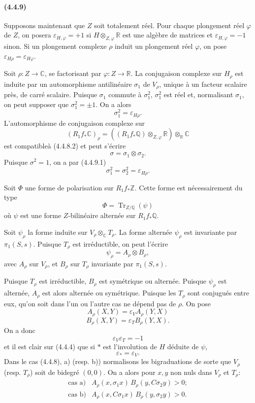 \documentclass[10pt]{article}
\newcommand{\C}{\mathbb C}
\newcommand{\Q}{\mathbb Q}
\newcommand{\Z}{\mathbb Z}
\newcommand{\fg}{\guillemotright}
\newcommand{\og}{\guillemotleft}
\newcommand{\R}{\mathbb R}
\newcommand{\Tr}{\operatorname{Tr}}
\begin{document}

\paragraph{(4.4.9)} Supposons maintenant que $Z$ soit totalement réel. Pour chaque plongement réel $\varphi$ de $Z$, on posera $\varepsilon_{H,\varphi}=+1$ si $H\otimes_{Z,\varphi}\R$ est une algèbre de matrices et $\varepsilon_{H,\varphi}=-1$ sinon. Si un plongement complexe $\rho$ induit un plongement réel $\varphi$, on pose $\varepsilon_{H\rho}=\varepsilon_{H\varphi}$.

Soit $\rho:Z\to\C$, se factorisant par $\varphi:Z\to\R$. La conjugaison complexe sur $H_\rho$ est induite par un automorphisme antilinéaire $\sigma_1$ de $V_\rho$, unique à un facteur scalaire près, de carré scalaire. Puisque $\sigma_1$ commute à $\sigma_1^2$, $\sigma_1^2$ est réel et, normalisant $\sigma_1$, on peut supposer que $\sigma_1^2=\pm1$. On a alors
\[
\tag{4.4.9.1}
\sigma_1^2=\varepsilon_{H\rho}.
\]
L'automorphisme de conjugaison complexe sur
\[
(R_1f_*\C)_\rho=((R_1f_*\Q)\otimes_{Z,\varphi}\R)\otimes_\R\C
\]
est \og compatible\fg à (4.4.8.2) et peut s'écrire
\[
\sigma=\sigma_1\otimes\sigma_2.
\]
Puisque $\sigma^2=1$, on a par (4.4.9.1)
\[
\tag{4.4.9.2}
\sigma_1^2=\sigma_2^2=\varepsilon_{H\rho}.
\]

Soit $\Phi$ une forme de polarisation sur $R_1f_*\Z$. Cette forme est nécessairement du type
\[
\Phi=\Tr_{Z/\Q}(\psi)
\]
où $\psi$ est une forme $Z$-bilinéaire alternée sur $R_1f_*\Q$.

Soit $\psi_\rho$ la forme induite sur $V_\rho\otimes_\C T_\rho$. La forme alternée $\psi_\rho$ est invariante par $\pi_1(S,s)$. Puisque $T_\rho$ est irréductible, on peut l'écrire
\[
\tag{4.4.9.3}
\psi_\rho=A_\rho\otimes B_\rho,
\]
avec $A_\rho$ sur $V_\rho$, et $B_\rho$ sur $T_\rho$ invariante par $\pi_1(S,s)$.

Puisque $T_\rho$ est irréductible, $B_\rho$ est symétrique ou alternée. Puisque $\psi_\rho$ est alternée, $A_\rho$ est alors alternée ou symétrique. Puisque les $T_\rho$ sont conjugués entre eux, qu'on soit dans l'un ou l'autre cas ne dépend pas de $\rho$. On pose
\[
\tag{4.4.9.4}
A_\rho(X,Y)=\varepsilon_V A_\rho(Y,X)
\]
\[
\tag{4.4.9.5}
B_\rho(X,Y)=\varepsilon_T B_\rho(Y,X).
\]
On a donc
\[
\tag{4.4.9.6}
\varepsilon_V\varepsilon_T=-1
\]
et il est clair sur (4.4.4) que si $*$ est l'involution de $H$ déduite de $\psi$,
\[
\tag{4.4.9.7}
\varepsilon_*=\varepsilon_V.
\]
Dans le cas (4.4.8), a) (resp. b)) normalisons les bigraduations de sorte que $V_\rho$ (resp. $T_\rho$) soit de bidegré $(0,0)$. On a alors pour $x,y$ non nuls dans $V_\rho$ et $T_\rho$:
\[
\begin{array}{ll}
\text{cas a)}& A_\rho(x,\sigma_1x)\,B_\rho(y,C\sigma_2y)>0;\\[0.3em]
\text{cas b)}& A_\rho(x,C\sigma_1x)\,B_\rho(y,\sigma_2y)>0.
\end{array}
\]
\end{document}
